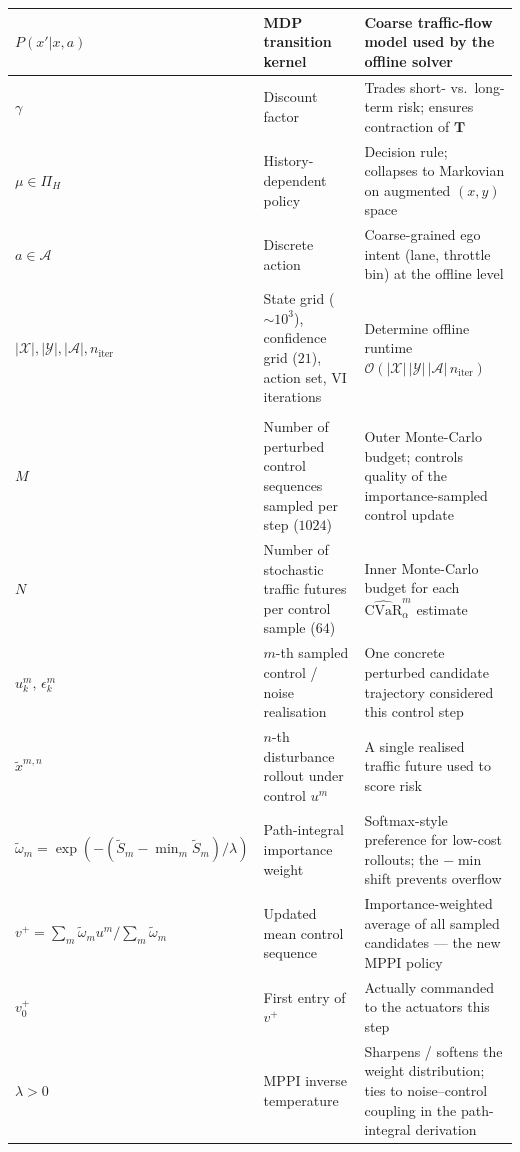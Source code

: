 \documentclass[letterpaper, 10 pt, conference]{ieeeconf}  %
\begin{document}
\begin{longtable}{|>{\raggedright\arraybackslash}p{}|>{\raggedright\arraybackslash}p{}|>{\raggedright\arraybackslash}p{}|}
\hline
$P(x'|x,a)$ & MDP transition kernel & Coarse traffic-flow model used by the offline solver \\
\hline
$\gamma$ & Discount factor & Trades short- vs.\ long-term risk; ensures contraction of $\mathbf{T}$ \\
\hline
$\mu\!\in\!\Pi_H$ & History-dependent policy & Decision rule; collapses to Markovian on augmented $(x,y)$ space \\
\hline
$a\!\in\!\mathcal{A}$ & Discrete action & Coarse-grained ego intent (lane, throttle bin) at the offline level \\
\hline
$|\mathcal{X}|,|\mathcal{Y}|,|\mathcal{A}|,n_{\mathrm{iter}}$ & State grid ($\sim\!10^{3}$), confidence grid ($21$), action set, VI iterations & Determine offline runtime $\mathcal{O}(|\mathcal{X}|\,|\mathcal{Y}|\,|\mathcal{A}|\,n_{\mathrm{iter}})$ \\
\hline
\multicolumn{3}{|l|}{\textit{Online MPPI sampling quantities}} \\
\hline
$M$ & Number of perturbed control sequences sampled per step ($1024$) & Outer Monte-Carlo budget; controls quality of the importance-sampled control update \\
\hline
$N$ & Number of stochastic traffic futures per control sample ($64$) & Inner Monte-Carlo budget for each $\widehat{\mathrm{CVaR}}_\alpha^{m}$ estimate \\
\hline
$u_k^{m},\,\epsilon_k^{m}$ & $m$-th sampled control / noise realisation & One concrete perturbed candidate trajectory considered this control step \\
\hline
$\tilde{x}^{m,n}$ & $n$-th disturbance rollout under control $u^{m}$ & A single realised traffic future used to score risk \\
\hline
$\tilde{\omega}_m\!=\!\exp(-(\tilde{S}_m\!-\!\min_m\tilde{S}_m)/\lambda)$ & Path-integral importance weight & Softmax-style preference for low-cost rollouts; the $-\min$ shift prevents overflow \\
\hline
$v^{+}\!=\!\sum_m\tilde{\omega}_m u^{m}/\sum_m\tilde{\omega}_m$ & Updated mean control sequence & Importance-weighted average of all sampled candidates --- the new MPPI policy \\
\hline
$v_0^{+}$ & First entry of $v^{+}$ & Actually commanded to the actuators this step \\
\hline
$\lambda\!>\!0$ & MPPI inverse temperature & Sharpens / softens the weight distribution; ties to noise--control coupling in the path-integral derivation \\

\end{longtable}
\end{document}
